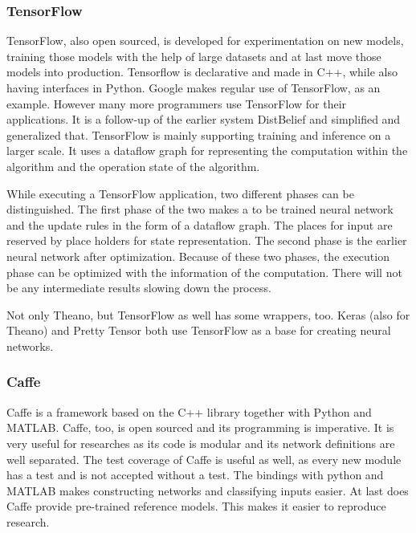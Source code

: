 \documentclass[10pt,a4paper]{article}
\begin{document}
	\subsubsection{TensorFlow}
	
	TensorFlow, also open sourced, is developed for experimentation on new 
	models, training those models with the help of large datasets and at last 
	move those models into production.\cite{abadi2016tensorflow} Tensorflow 
	is 
	declarative and made in C++, while also having interfaces in Python. 
	\cite{rampasek2016tensorflow} Google makes regular use of TensorFlow, 
	as an example. However many more programmers use TensorFlow for their 
	applications. It is a follow-up of the earlier system DistBelief and 
	simplified and generalized that. TensorFlow is mainly supporting training 
	and inference on a larger scale. It uses a dataflow graph for representing 
	the computation within the algorithm and the operation state of the 
	algorithm. \cite{abadi2016tensorflow}
	
	While executing a TensorFlow application, two different phases can be 
	distinguished. The first phase of the two makes a to be trained neural 
	network and the update rules in the form of a dataflow graph. The places 
	for input are reserved by place holders for state representation. The 
	second phase is the earlier neural network after optimization. Because of 
	these two phases, the execution phase can be optimized with the information 
	of the computation. There will not be any intermediate results slowing down 
	the process. \cite{abadi2016tensorflow}
	
	Not only Theano, but TensorFlow as well has some wrappers, too. Keras (also 
	for Theano) and Pretty Tensor both use TensorFlow as a base for creating 
	neural networks. \cite{rampasek2016tensorflow}
	
	\subsubsection{Caffe}
	
	Caffe is a framework based on the C++ library together with Python and 
	MATLAB. Caffe, too, is open sourced and its programming is imperative. 
	\cite{rampasek2016tensorflow} It is very useful for researches as 
	its code is modular and its network definitions are well separated. The 
	test coverage of Caffe is useful as well, as every new module has a test 
	and is not accepted without a test. The bindings with python and MATLAB 
	makes constructing networks and classifying inputs easier. At last does 
	Caffe provide pre-trained reference models. This makes it easier to 
	reproduce research.
	\cite{DBLP:journals/corr/JiaSDKLGGD14}
	
\end{document}

